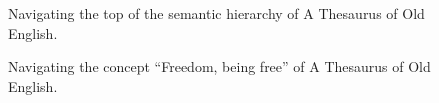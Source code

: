 \begin{figure}[htbp]
	\caption[]{\label{fig:Stolk2021a:Fig2} Navigating the top of the semantic hierarchy of A Thesaurus of Old English.}
\end{figure}

\begin{figure}[htbp]
	\caption[]{\label{fig:Stolk2021a:Fig3} Navigating the concept “Freedom, being free” of A Thesaurus of Old English.}
\end{figure}

